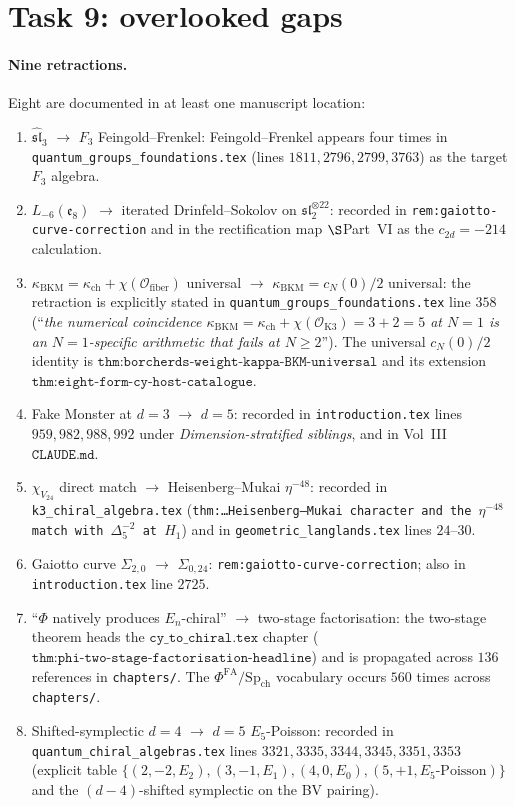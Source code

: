 \documentclass[11pt]{article}
\providecommand{\kch}{\kappa_{\mathrm{ch}}}
\providecommand{\kBKM}{\kappa_{\mathrm{BKM}}}
\providecommand{\PhiFA}{\Phi^{\mathrm{FA}}}
\providecommand{\SpCh}{\mathrm{Sp}_{\mathrm{ch}}}
\begin{document}
\section{Task 9: overlooked gaps}

\paragraph{Nine retractions.} Eight are documented in at least one
manuscript location:
\begin{enumerate}
\item $\widehat{\mathfrak{sl}}_3$ $\to$ $F_3$ Feingold--Frenkel:
Feingold--Frenkel appears four times in
\texttt{quantum\_groups\_foundations.tex} (lines $1811, 2796, 2799, 3763$)
as the target $F_3$ algebra.
\item $L_{-6}(\mathfrak{e}_8)$ $\to$ iterated Drinfeld--Sokolov on
$\mathfrak{sl}_2^{\otimes 22}$: recorded in
\texttt{rem:gaiotto-curve-correction} and in the
rectification map $\S$Part~VI as the $c_{2d} = -214$ calculation.
\item $\kBKM = \kch + \chi(\mathcal{O}_{\mathrm{fiber}})$ universal
$\to$ $\kBKM = c_N(0)/2$ universal: the retraction is explicitly
stated in \texttt{quantum\_groups\_foundations.tex} line $358$
(``\emph{the numerical coincidence $\kBKM = \kch + \chi(\mathcal{O}_{\mathrm{K3}}) = 3 + 2 = 5$ at $N = 1$ is an $N = 1$-specific arithmetic that fails at $N \geq 2$}''). The universal $c_N(0)/2$ identity is
$\texttt{thm:borcherds-weight-kappa-BKM-universal}$ and its
extension $\texttt{thm:eight-form-cy-host-catalogue}$.
\item Fake Monster at $d = 3$ $\to$ $d = 5$: recorded in
\texttt{introduction.tex} lines $959, 982, 988, 992$ under
\emph{Dimension-stratified siblings}, and in Vol~III $\texttt{CLAUDE.md}$.
\item $\chi_{V_{24}}$ direct match $\to$ Heisenberg--Mukai
$\eta^{-48}$: recorded in \texttt{k3\_chiral\_algebra.tex}
(\texttt{thm:\ldots Heisenberg--Mukai character and the
$\eta^{-48}$ match with $\Delta_5^{-2}$ at $H_1$}) and in
\texttt{geometric\_langlands.tex} lines $24$--$30$.
\item Gaiotto curve $\Sigma_{2,0}$ $\to$ $\Sigma_{0,24}$:
\texttt{rem:gaiotto-curve-correction}; also in
\texttt{introduction.tex} line $2725$.
\item ``$\Phi$ natively produces $E_n$-chiral'' $\to$ two-stage
factorisation: the two-stage theorem heads the
$\texttt{cy\_to\_chiral.tex}$ chapter
($\texttt{thm:phi-two-stage-factorisation-headline}$) and is
propagated across $136$ references in \texttt{chapters/}. The
$\PhiFA / \SpCh$ vocabulary occurs $560$ times across
\texttt{chapters/}.
\item Shifted-symplectic $d = 4$ $\to$ $d = 5$ $E_5$-Poisson:
recorded in \texttt{quantum\_chiral\_algebras.tex} lines
$3321, 3335, 3344, 3345, 3351, 3353$ (explicit table
$\{(2,-2,E_2), (3,-1,E_1), (4,0,E_0), (5,+1,E_5\text{-Poisson})\}$
and the $(d - 4)$-shifted symplectic on the BV pairing).
\end{enumerate}
\end{document}
